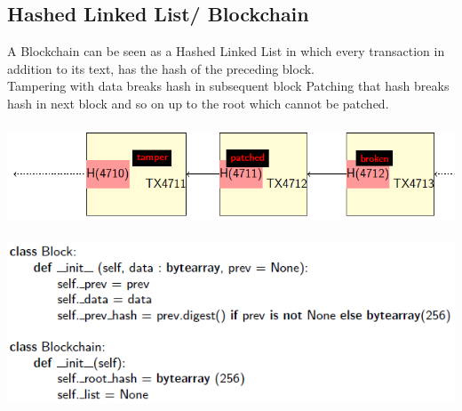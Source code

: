 \documentclass{article}
\begin{document}
\subsection{Hashed Linked List/ Blockchain}
A Blockchain can be seen as a Hashed Linked List in which every transaction in addition to its text, has the hash of the preceding block.\\
Tampering with data breaks hash in subsequent block
Patching that hash breaks hash in next block and so on up to the root which cannot be patched.\\\\
\includegraphics[scale=0.6]{9.png}\\\\
\includegraphics[scale=0.6]{10.png}\\\\
\end{document}
